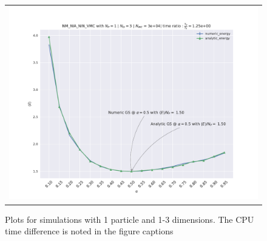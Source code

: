 \begin{figure}
\begin{tabular}{cc}
\multicolumn{2}{c}{\includegraphics[width=0.5\paperwidth]{figures/NM_NIA_NIN_np_1_nd_3.pdf} }
\end{tabular}
\caption{Plots for simulations with 1 particle and 1-3 dimensions. The CPU time difference is noted in the figure captions}
\label{fig:1b_1}
\end{figure}

